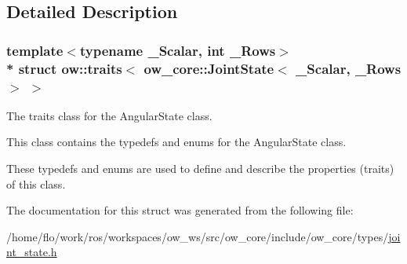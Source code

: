 \subsection{Detailed Description}
\subsubsection*{template$<$typename \+\_\+\+Scalar, int \+\_\+\+Rows$>$\\*
struct ow\+::traits$<$ ow\+\_\+core\+::\+Joint\+State$<$ \+\_\+\+Scalar, \+\_\+\+Rows $>$ $>$}

The traits class for the Angular\+State class. 

This class contains the typedefs and enums for the Angular\+State class.

These typedefs and enums are used to define and describe the properties (traits) of this class. 

The documentation for this struct was generated from the following file\+:\begin{DoxyCompactItemize}
\item 
/home/flo/work/ros/workspaces/ow\+\_\+ws/src/ow\+\_\+core/include/ow\+\_\+core/types/\hyperlink{joint__state_8h}{joint\+\_\+state.\+h}\end{DoxyCompactItemize}
